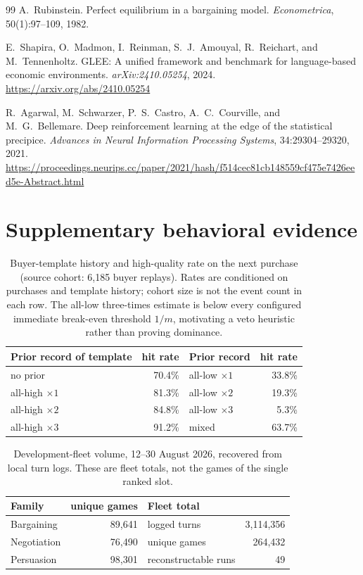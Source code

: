 \documentclass{article}
\begin{document}
\begin{thebibliography}{99}
A.~Rubinstein. Perfect equilibrium in a bargaining model.
\emph{Econometrica}, 50(1):97--109, 1982.

E.~Shapira, O.~Madmon, I.~Reinman, S.~J.~Amouyal, R.~Reichart, and M.~Tennenholtz.
GLEE: A unified framework and benchmark for language-based economic environments.
\emph{arXiv:2410.05254}, 2024. \url{https://arxiv.org/abs/2410.05254}

R.~Agarwal, M.~Schwarzer, P.~S.~Castro, A.~C.~Courville, and M.~G.~Bellemare.
Deep reinforcement learning at the edge of the statistical precipice.
\emph{Advances in Neural Information Processing Systems}, 34:29304--29320, 2021.
\url{https://proceedings.neurips.cc/paper/2021/hash/f514cec81cb148559cf475e7426eed5e-Abstract.html}
\end{thebibliography}


\clearpage
\appendix
\section{Supplementary behavioral evidence}
\setcounter{table}{0}
\renewcommand{\theHtable}{A\arabic{table}}
\renewcommand{\thetable}{A\arabic{table}}

\begin{table}[H]
\centering\small
\caption{Buyer-template history and high-quality rate on the next purchase
(source cohort: 6,185 buyer replays). Rates are conditioned on purchases and
template history; cohort size is not the event count in each row. The all-low
three-times estimate is below every configured immediate break-even threshold
$1/m$, motivating a veto heuristic rather than proving dominance.}
\label{tab:ladder}
\begin{tabular}{@{}lrlr@{}}
\toprule
Prior record of template & hit rate & Prior record & hit rate\\
\midrule
no prior & 70.4\% & all-low $\times1$ & 33.8\%\\
all-high $\times1$ & 81.3\% & all-low $\times2$ & 19.3\%\\
all-high $\times2$ & 84.8\% & all-low $\times3$ & 5.3\%\\
all-high $\times3$ & 91.2\% & mixed & 63.7\%\\
\bottomrule
\end{tabular}
\end{table}

\begin{table}[H]
\centering\small
\caption{Development-fleet volume, 12--30 August 2026, recovered from local
turn logs. These are fleet totals, not the games of the single ranked slot.}
\label{tab:volume}
\begin{tabular}{@{}lrlr@{}}
\toprule
Family & unique games & Fleet total & \\
\midrule
Bargaining & 89,641 & logged turns & 3,114,356\\
Negotiation & 76,490 & unique games & 264,432\\
Persuasion & 98,301 & reconstructable runs & 49\\
\bottomrule
\end{tabular}
\end{table}
\end{document}
